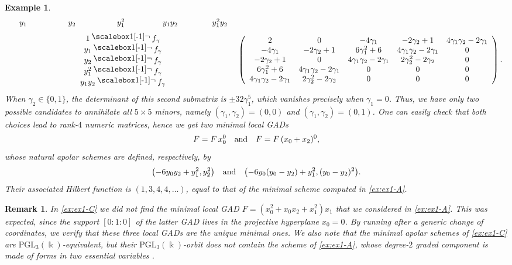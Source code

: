 \documentclass{amsart}
\theoremstyle{plain}
\newtheorem{example}[example]{Example}
\newtheorem{remark}[remark]{Remark}
\renewcommand{\k}{\Bbbk}
\def\c{\gamma}
\newcommand{\ideal}[1]{\mathopen{}\bigl( #1 \bigr)\mathclose{}}
\newcommand{\contract}{\mathbin{\mathpalette\dointprod\relax}}
\newcommand{\dointprod}[2]{%
  \raisebox{\depth}{\scalebox{1}[-1]{$#1\lnot$}}}
\def\\k{{\mathsf{k}}}
\def\PGL{\mathrm{PGL}}
\numberwithin{equation}{section}
\begin{document}
\begin{example}
\[\begin{array}{c@{\;}c}
\begin{array}{ccccc}
\hspace{0.25cm} y_1 \hspace{1.45cm} & y_2 \hspace{1.45cm} & y_1^2 \hspace{1.3cm} & y_1y_2 \hspace{1.15cm} & y_1^2y_2 \hspace{0.2cm}
\end{array}
\\[6pt]
\begin{array}{c}
1\contract f_{\c}\\
y_1\contract f_{\c}\\
y_2\contract f_{\c}\\
y_1^2\contract f_{\c}\\
y_1y_2\contract f_{\c}
\end{array}
&
\left(
\begin{array}{ccccc}
2 & 0 & -4\gamma_1 & -2\gamma_2+1 & 4\gamma_1\gamma_2-2\gamma_1 \\
-4\gamma_1 & -2\gamma_2+1 & 6\gamma_1^2+6 & 4\gamma_1\gamma_2-2\gamma_1 & 0 \\
-2\gamma_2+1 & 0 & 4\gamma_1\gamma_2-2\gamma_1 & 2\gamma_2^2-2\gamma_2 & 0 \\
6\gamma_1^2+6 & 4\gamma_1\gamma_2-2\gamma_1 & 0 & 0 & 0 \\
4\gamma_1\gamma_2-2\gamma_1 & 2\gamma_2^2-2\gamma_2 & 0 & 0 & 0
\end{array}
\right).
\end{array}
\]
When $\gamma_2 \in \{0,1\}$, the determinant of this second submatrix is $\pm 32\gamma_1^5$, which vanishes precisely when $\gamma_1=0$.
Thus, we have only two possible candidates to annihilate all $5 \times 5$ minors, namely $(\gamma_1,\gamma_2) = (0,0)$ and $(\gamma_1,\gamma_2) = (0,1)$.
One can easily check that both choices lead to rank-$4$ numeric matrices, hence we get two minimal local GADs
\[ F = F\, x_0^0 \quad \textnormal{and} \quad F = F\, (x_0+x_2)^0, \]
whose natural apolar schemes are defined, respectively, by
\[ \ideal{-6y_0y_2 + y_1^2, y_2^2 } \quad \textnormal{and} \quad \ideal{ -6y_0(y_0-y_2) + y_1^2, (y_0-y_2)^2 }. \]
Their associated Hilbert function is $(1,3,4,4,\dots)$, equal to that of the minimal scheme computed in \cref{ex:ex1-A}.
\end{example}

\begin{remark}
    In \cref{ex:ex1-C} we did \emph{not} find the minimal local GAD $F = (x_0^2+x_0x_2+x_1^2)x_1$ that we considered in \cref{ex:ex1-A}.
    This was expected, since the support $[0:1:0]$ of the latter GAD lives in the projective hyperplane $x_0 = 0$.
    By running  after a generic change of coordinates, we verify that these three local GADs are the unique minimal ones.
    We also note that the minimal apolar schemes of \cref{ex:ex1-C} are $\PGL_3(\k)$-equivalent, but their $\PGL_3(\k)$-orbit does not contain the scheme of \cref{ex:ex1-A}, whose degree-$2$ graded component is made of forms in two \emph{essential variables} \cite{C05}.
\end{remark}
\end{document}
